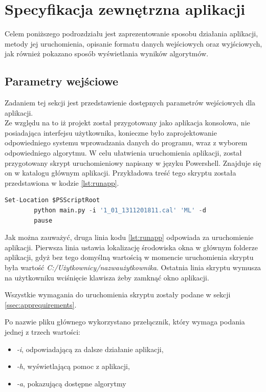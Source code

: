 \section{Specyfikacja zewnętrzna aplikacji}
Celem poniższego podrozdziału jest zaprezentowanie sposobu działania aplikacji, metody jej uruchomienia, opisanie formatu danych wejściowych oraz wyjściowych, jak również pokazano sposób wyświetlania wyników algorytmów.
\subsection{Parametry wejściowe}
\label{ssec:parameters}
Zadaniem tej sekcji jest przedstawienie dostępnych parametrów wejściowych dla aplikacji.\\
Ze względu na to iż projekt został przygotowany jako aplikacja konsolowa, nie posiadająca interfejsu użytkownika, konieczne było zaprojektowanie odpowiedniego systemu wprowadzania danych do programu, wraz z wyborem odpowiedniego algorytmu. W celu ułatwienia uruchomienia aplikacji, został przygotowany skrypt uruchomieniowy napisany w języku Powershell. Znajduje się on w katalogu głównym aplikacji. Przykładowa treść tego skryptu została przedstawiona w kodzie \ref{lst:runapp}.\par
\begin{lstlisting}[language=Python, caption=Skrypt uruchomieniowy aplikacji, label={lst:runapp}]
        Set-Location $PSScriptRoot
        python main.py -i '1_01_1311201811.cal' 'ML' -d
        pause
\end{lstlisting}
Jak można zauważyć, druga linia kodu \ref{lst:runapp} odpowiada za uruchomienie aplikacji. Pierwsza linia ustawia lokalizację środowiska okna w głównym folderze aplikacji, gdyż bez tego domyślną wartością w momencie uruchomienia skryptu była wartość \emph{C:/Użytkownicy/nazwaużytkownika}. Ostatnia linia skryptu wymusza na użytkowniku wciśnięcie klawisza żeby zamknąć okno aplikacji.\par
Wszystkie wymagania do uruchomienia skryptu zostały podane w sekcji \ref{ssec:apprequirements}.\par
Po nazwie pliku głównego wykorzystano przełącznik, który wymaga podania jednej z trzech wartości:
\begin{itemize}
        \item \emph{-i}, odpowiadającą za dalsze działanie aplikacji,
        \item \emph{-h}, wyświetlającą pomoc z aplikacji,
        \item \emph{-a}, pokazującą dostępne algorytmy
\end{itemize}
